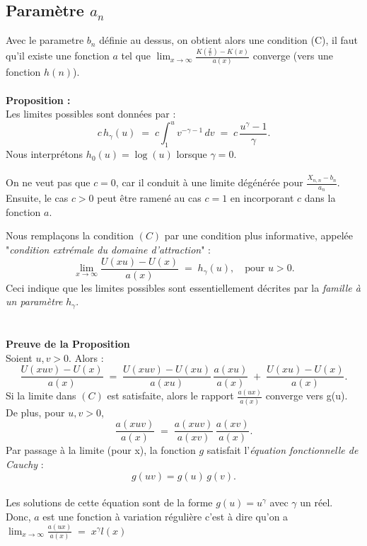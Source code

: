 \documentclass{article}
\begin{document}
\subsection{Paramètre $a_n$}
Avec le parametre $b_n$ définie au dessus, on obtient alors une condition (C), il faut qu'il existe une fonction $a$ tel que $\lim_{x \to \infty} \frac{K(\frac{x}{v}) - K(x)}{a(x)}$ converge (vers une fonction $h(n)$). 
\\
\\
\textbf{Proposition :}
\\
Les limites possibles sont données par :
\[
c\,h_{\gamma}(u) 
\;=\; 
c \int_{1}^{u} v^{-\gamma - 1}\,dv 
\;=\; 
c\,\frac{u^{\gamma} - 1}{\gamma}.
\]
Nous interprétons $h_{0}(u) = \log(u)$ lorsque $\gamma = 0$. 
\\
\\

\; On ne veut pas que $c=0$, car il conduit à une limite dégénérée pour $\frac{X_{n,n} - b_n}{a_n}$. 
Ensuite, le cas $c>0$ peut être ramené au cas $c=1$ en incorporant $c$ dans la fonction $a$. 

Nous remplaçons la condition $(C)$ par une condition plus informative, appelée 
"\textit{condition extrémale du domaine d’attraction}" :
\[
\lim_{x\to \infty} \frac{U(xu) - U(x)}{a(x)} 
\;=\; 
h_{\gamma}(u), 
\quad 
\text{pour } u>0.
\]
Ceci indique que les limites possibles sont essentiellement décrites par la \textit{famille à un paramètre} $h_{\gamma}$. 
\\
\\
\\
\textbf{Preuve de la Proposition}  
\\
Soient $u,v > 0$. Alors :
\[
\frac{U(xuv) - U(x)}{a(x)} 
\;=\; 
\frac{U(xuv) - U(xu)}{a(xu)} \,\frac{a(xu)}{a(x)}
\;+\;
\frac{U(xu) - U(x)}{a(x)}.
\tag{2.3}
\]
Si la limite dans $(C)$ est satisfaite, alors le rapport $\frac{a(ux)}{a(x)}$ converge vers g(u).
\\
De plus, pour $u,v>0$,
\[
\frac{a(xuv)}{a(x)} 
\;=\;
\frac{a(xuv)}{a(xv)} \,\frac{a(xv)}{a(x)}.
\]
Par passage à la limite (pour x), la fonction $g$ satisfait l'\textit{équation fonctionnelle de Cauchy} :
\[
g(uv) = g(u)\,g(v).
\]
\\
Les solutions de cette équation sont de la forme $g(u)= u^{\gamma}$ avec $\gamma$ un réel.
\\
Donc, $a$ est une fonction à variation régulière c'est à dire qu'on a $\lim_{x\to \infty} \frac{a(ux)}{a(x)} \;=\; x^{\gamma} l(x)$
\\
\\
\end{document}
